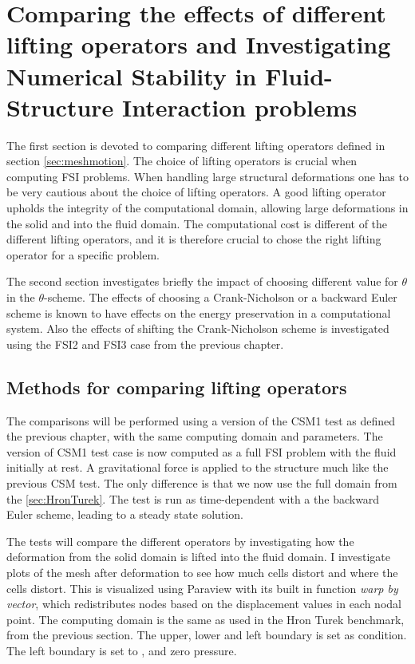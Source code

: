 \chapter{Comparing the effects of different lifting operators and Investigating Numerical Stability in Fluid-Structure Interaction problems}\label{sec:mesh_motion}
The first section is devoted to comparing different lifting operators defined in section \ref{sec:meshmotion}. The choice of lifting operators is crucial when computing FSI problems. When handling large structural deformations one has to be very cautious about the choice of lifting operators. A good lifting operator upholds the integrity of the computational domain, allowing large deformations in the solid and into the fluid domain. The computational cost is different of the different lifting operators, and it is therefore crucial to chose the right lifting operator for a specific problem. 

The second section investigates briefly the impact of choosing different value for $\theta$ in the $\theta$-scheme. The effects of choosing a Crank-Nicholson or a backward Euler scheme is known to have effects on the energy preservation in a computational system. Also the effects of shifting the Crank-Nicholson scheme is investigated using the FSI2 and FSI3 case from the previous chapter.
\section{Methods for comparing lifting operators}
The comparisons will be performed using a version of the CSM1 test as defined the previous chapter, with the same computing domain and parameters. The version of CSM1 test case is now computed as a full FSI problem with the fluid initially at rest. A gravitational force is applied to the structure much like the previous CSM test. The only difference is that we now use the full domain from the \ref{sec:HronTurek}. The test is run as time-dependent with a the backward Euler scheme, leading to a steady state solution.

The tests will compare the different operators by investigating how the deformation from the solid domain is lifted into the fluid domain. I investigate plots of the mesh after deformation to see how much cells distort and where the cells distort. This is visualized using Paraview with its built in function \textit{warp by vector}, which redistributes nodes based on the displacement values in each nodal point.
The computing domain is the same as used in the Hron Turek benchmark, from the previous section.
The upper, lower and left boundary is set as  condition. The left boundary is set to , and zero pressure. \newline

